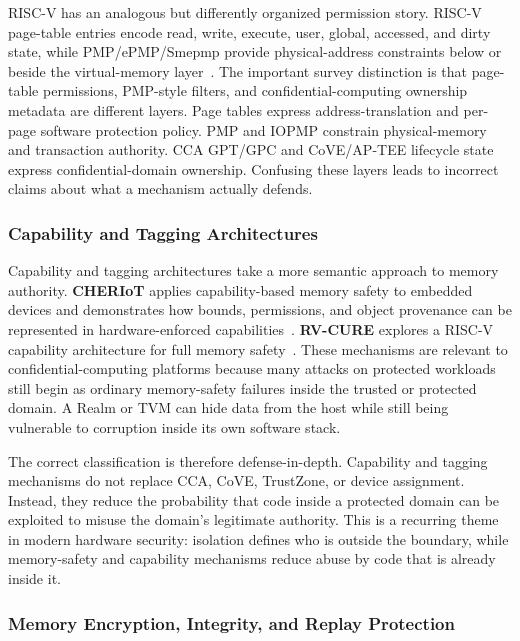 RISC-V has an analogous but differently organized permission story. RISC-V page-table entries encode read, write, execute, user, global, accessed, and dirty state, while PMP/ePMP/Smepmp provide physical-address constraints below or beside the virtual-memory layer~\cite{riscv_privileged}. The important survey distinction is that page-table permissions, PMP-style filters, and confidential-computing ownership metadata are different layers. Page tables express address-translation and per-page software protection policy. PMP and IOPMP constrain physical-memory and transaction authority. CCA GPT/GPC and CoVE/AP-TEE lifecycle state express confidential-domain ownership. Confusing these layers leads to incorrect claims about what a mechanism actually defends.

\subsubsection{Capability and Tagging Architectures}

Capability and tagging architectures take a more semantic approach to memory authority. \textbf{CHERIoT} applies capability-based memory safety to embedded devices and demonstrates how bounds, permissions, and object provenance can be represented in hardware-enforced capabilities~\cite{amar2023cheriot}. \textbf{RV-CURE} explores a RISC-V capability architecture for full memory safety~\cite{kim2023rvcure}. These mechanisms are relevant to confidential-computing platforms because many attacks on protected workloads still begin as ordinary memory-safety failures inside the trusted or protected domain. A Realm or TVM can hide data from the host while still being vulnerable to corruption inside its own software stack.

The correct classification is therefore defense-in-depth. Capability and tagging mechanisms do not replace CCA, CoVE, TrustZone, or device assignment. Instead, they reduce the probability that code inside a protected domain can be exploited to misuse the domain's legitimate authority. This is a recurring theme in modern hardware security: isolation defines who is outside the boundary, while memory-safety and capability mechanisms reduce abuse by code that is already inside it.

\subsubsection{Memory Encryption, Integrity, and Replay Protection}

